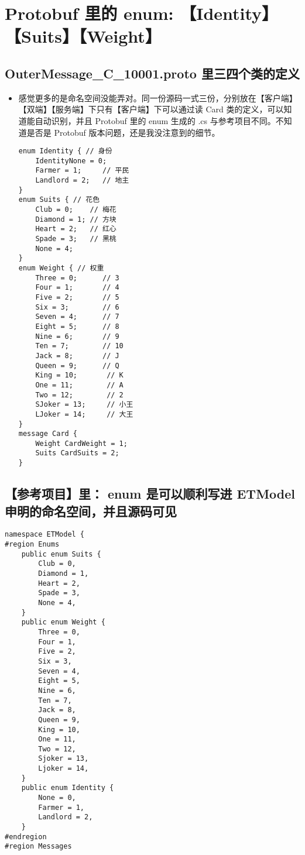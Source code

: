 \documentclass[9pt, b5paper]{article}
\begin{document}
\section{Protobuf 里的 enum: 【Identity】【Suits】【Weight】}
\label{sec-5}
\subsection{OuterMessage\_C\_10001.proto 里三四个类的定义}
\label{sec-5-1}
\begin{itemize}
\item 感觉更多的是命名空间没能弄对。同一份源码一式三份，分别放在【客户端】【双端】【服务端】下只有【客户端】下可以通过读 Card 类的定义，可以知道能自动识别，并且 Protobuf 里的 enum 生成的 .cs 与参考项目不同。不知道是否是 Protobuf 版本问题，还是我没注意到的细节。
\begin{verbatim}
enum Identity { // 身份
    IdentityNone = 0;
    Farmer = 1;     // 平民
    Landlord = 2;   // 地主
}
enum Suits { // 花色
    Club = 0;    // 梅花
    Diamond = 1; // 方块
    Heart = 2;   // 红心
    Spade = 3;   // 黑桃
    None = 4;
}
enum Weight { // 权重
    Three = 0;      // 3
    Four = 1;       // 4
    Five = 2;       // 5
    Six = 3;        // 6
    Seven = 4;      // 7
    Eight = 5;      // 8
    Nine = 6;       // 9
    Ten = 7;        // 10
    Jack = 8;       // J
    Queen = 9;      // Q
    King = 10;       // K
    One = 11;        // A
    Two = 12;        // 2
    SJoker = 13;     // 小王
    LJoker = 14;     // 大王
}
message Card {
    Weight CardWeight = 1;
    Suits CardSuits = 2;
}
\end{verbatim}
\end{itemize}
\subsection{【参考项目】里： enum 是可以顺利写进 ETModel 申明的命名空间，并且源码可见}
\label{sec-5-2}
\begin{verbatim}
namespace ETModel {
#region Enums
    public enum Suits {
        Club = 0,
        Diamond = 1,
        Heart = 2,
        Spade = 3,
        None = 4,
    }
    public enum Weight {
        Three = 0,
        Four = 1,
        Five = 2,
        Six = 3,
        Seven = 4,
        Eight = 5,
        Nine = 6,
        Ten = 7,
        Jack = 8,
        Queen = 9,
        King = 10,
        One = 11,
        Two = 12,
        Sjoker = 13,
        Ljoker = 14,
    }
    public enum Identity {
        None = 0,
        Farmer = 1,
        Landlord = 2,
    }
#endregion
#region Messages
\end{verbatim}
\end{document}
